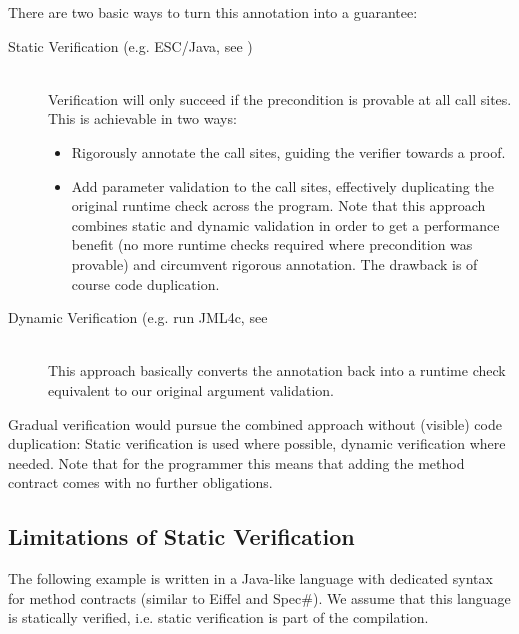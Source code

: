There are two basic ways to turn this annotation into a guarantee:
\begin{description}
    \item[Static Verification (e.g. ESC/Java, see \cite{leino2000esc})]~\\
    Verification will only succeed if the precondition is provable at all call sites.
    This is achievable in two ways:
    \begin{itemize}
        \item
        Rigorously annotate the call sites, guiding the verifier towards a proof.
        \item 
        Add parameter validation to the call sites, effectively duplicating the original runtime check across the program.
        Note that this approach combines static and dynamic validation in order to get a performance benefit (no more runtime checks required where precondition was provable) and circumvent rigorous annotation.
        The drawback is of course code duplication.
    \end{itemize}
    
    
    \item[Dynamic Verification (e.g. run JML4c, see \cite{sarcar2010new}]~\\
    This approach basically converts the annotation back into a runtime check equivalent to our original argument validation.
\end{description}

Gradual verification would pursue the combined approach without (visible) code duplication:
Static verification is used where possible, dynamic verification where needed.
Note that for the programmer this means that adding the method contract comes with no further obligations.

\subsection{Limitations of Static Verification}
\label{ssec:limitations-of-static}
The following example is written in a Java-like language with dedicated syntax for method contracts (similar to Eiffel and Spec\#).
We assume that this language is statically verified, i.e. static verification is part of the compilation.

